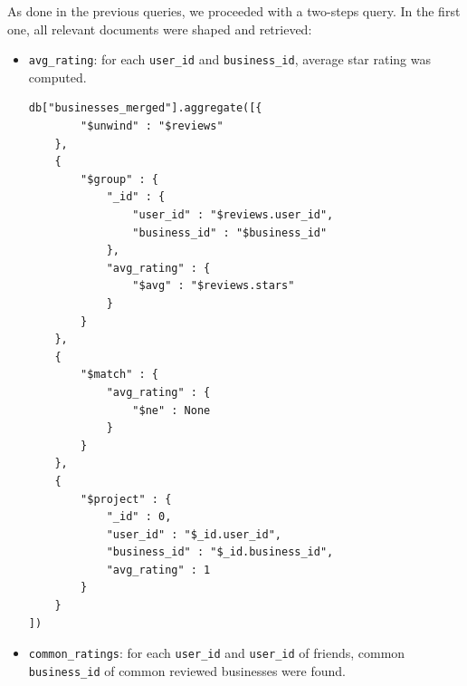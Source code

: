 \documentclass{Configuration_Files/PoliMi3i_thesis}
\begin{document}
As done in the previous queries, we proceeded with a two-steps query. In the first one, all relevant documents were shaped and retrieved:
\begin{itemize}
    \item \texttt{avg\_rating}: for each \texttt{user\_id} and \texttt{business\_id}, average star rating was computed. 

\bigskip

\begin{lstlisting}[style = mongodb]
db["businesses_merged"].aggregate([{
        "$unwind" : "$reviews"
    },
    {
        "$group" : {
            "_id" : {
                "user_id" : "$reviews.user_id",
                "business_id" : "$business_id"
            },
            "avg_rating" : {
                "$avg" : "$reviews.stars"
            }
        }
    },
    {
        "$match" : {
            "avg_rating" : {
                "$ne" : None
            }
        }
    },
    {
        "$project" : {
            "_id" : 0,
            "user_id" : "$_id.user_id",
            "business_id" : "$_id.business_id",
            "avg_rating" : 1
        }
    }
])
\end{lstlisting}

\bigskip

\item \texttt{common\_ratings}: for each \texttt{user\_id} and \texttt{user\_id} of friends, common \texttt{business\_id} of common reviewed businesses were found. 

\bigskip


\end{itemize}
\end{document}
